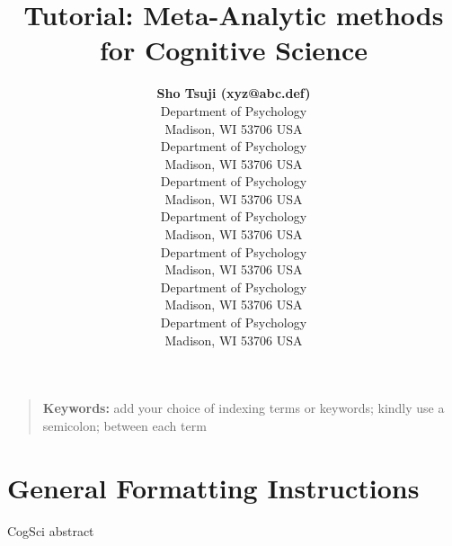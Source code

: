 \documentclass[10pt,letterpaper]{article}
\title{Tutorial: Meta-Analytic methods for Cognitive Science}
\author{{\large \bf Sho Tsuji (xyz@abc.def)} \\
  Department of Psychology\\
  Madison, WI 53706 USA
  \And {\large \bf Molly Lewis(xyz@abc.def)} \\
    Department of Psychology\\
    Madison, WI 53706 USA
  \And {\large \bf Mika Braginsky (xyz@abc.def)} \\
      Department of Psychology\\
      Madison, WI 53706 USA
  \AND {\large \bf Christina Bergmann (xyz@abc.def)} \\
        Department of Psychology \\
        Madison, WI 53706 USA
  \And      {\large \bf Page Piccinini (xyz@abc.def)} \\
          Department of Psychology \\
          Madison, WI 53706 USA
  \And        {\large \bf Mike Frank (xyz@abc.def)} \\
            Department of Psychology \\
            Madison, WI 53706 USA
  \AND          {\large \bf Alex Cristia (xyz@abc.def)} \\
              Department of Psychology \\
              Madison, WI 53706 USA}
\begin{document}
\maketitle

\begin{quote}
\small
\textbf{Keywords:}
add your choice of indexing terms or keywords; kindly use a
semicolon; between each term
\end{quote}

\section{General Formatting Instructions}

CogSci abstract

\end{document}
